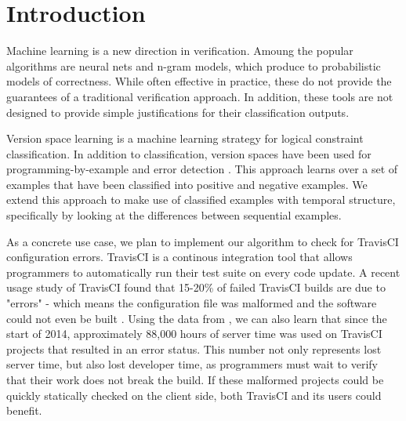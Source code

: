 \section{Introduction}

Machine learning is a new direction in verification\cite{Santolucito2016,ETH_Guy}.
Amoung the popular algorithms are neural nets and n-gram models, which produce to probabilistic models of correctness.
While often effective in practice, these do not provide the guarantees of a traditional verification approach.
In addition, these tools are not designed to provide simple justifications for their classification outputs.

Version space learning is a machine learning strategy for logical constraint classification\cite{mitchell82}. 
In addition to classification, version spaces have been used for programming-by-example \cite{lau2000version} and error detection \cite{Santolucito2016}.
This approach learns over a set of examples that have been classified into positive and negative examples.
We extend this approach to make use of classified examples with temporal structure, specifically by looking at the differences between sequential examples.

As a concrete use case, we plan to implement our algorithm to check for TravisCI configuration errors.
TravisCI is a continous integration tool that allows programmers to automatically run their test suite on every code update.
A recent usage study of TravisCI found that 15-20\% of failed TravisCI builds are due to "errors" - which means the configuration file was malformed and the software could not even be built \cite{API}.
Using the data from \cite{API}, we can also learn that since the start of 2014, approximately 88,000 hours of server time was used on TravisCI projects that resulted in an error status.
This number not only represents lost server time, but also lost developer time, as programmers must wait to verify that their work does not break the build.
If these malformed projects could be quickly statically checked on the client side, both TravisCI and its users could benefit.


